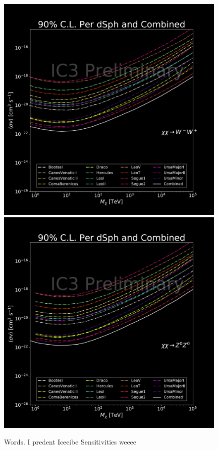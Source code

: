 \begin{figure}[t]
{        \includegraphics[scale=0.275]{figures/ic_DM/dm_plots/WW_money_plot_comb.pdf}
        \includegraphics[scale=0.275]{figures/ic_DM/dm_plots/ZZ_money_plot_comb.pdf}
    }
    \caption{Words. I predent Icecibe Sensitivities weeee}
    \label{fig:icDM_sensitivity_1of2}
\end{figure}


